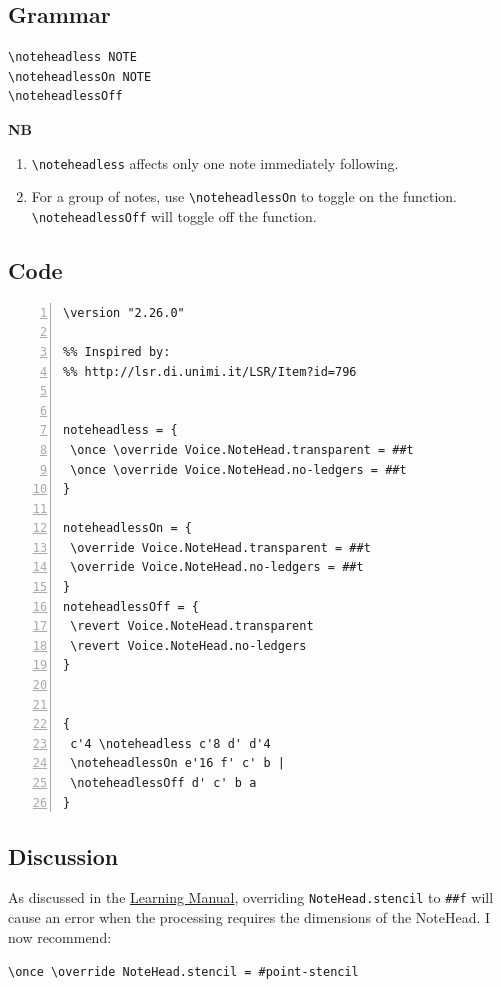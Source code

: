 \subsection{Grammar}
\begin{verbatim}
\noteheadless NOTE
\noteheadlessOn NOTE 
\noteheadlessOff
\end{verbatim}

\textbf{NB} 
\begin{enumerate} 
\item \verb|\noteheadless| affects only one note immediately following. 
\item For a group of notes, use \verb|\noteheadlessOn| to toggle on the function.  \verb|\noteheadlessOff| will toggle off the function.
\end{enumerate}

\subsection{Code}
\begin{Verbatim}[numbers=left,xleftmargin=5mm]
\version "2.26.0"

%% Inspired by:
%% http://lsr.di.unimi.it/LSR/Item?id=796


noteheadless = {
 \once \override Voice.NoteHead.transparent = ##t
 \once \override Voice.NoteHead.no-ledgers = ##t
}

noteheadlessOn = {
 \override Voice.NoteHead.transparent = ##t
 \override Voice.NoteHead.no-ledgers = ##t
}
noteheadlessOff = {
 \revert Voice.NoteHead.transparent
 \revert Voice.NoteHead.no-ledgers
}


{
 c'4 \noteheadless c'8 d' d'4
 \noteheadlessOn e'16 f' c' b |
 \noteheadlessOff d' c' b a
}

\end{Verbatim}
\label{noteheadless_discussion}
\subsection{Discussion}

As discussed in the \href{https://lilypond.org/doc/v2.26/Documentation/learning/the-stencil-property}{Learning Manual}, overriding \Verb|NoteHead.stencil| to \Verb|##f| will cause an error when the processing requires the dimensions of the NoteHead. I now recommend: \par

\Verb|\once \override NoteHead.stencil = #point-stencil| \par

